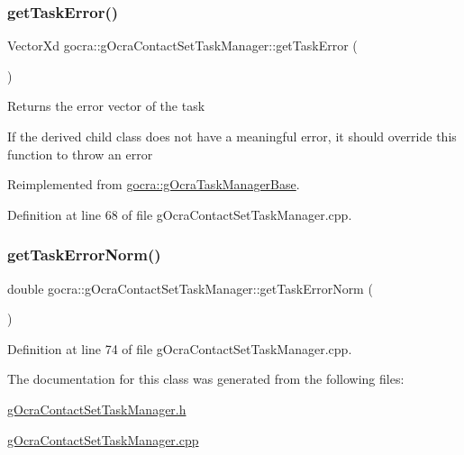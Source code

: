 \subsubsection{\texorpdfstring{get\+Task\+Error()}{getTaskError()}}
{\footnotesize\ttfamily Vector\+Xd gocra\+::g\+Ocra\+Contact\+Set\+Task\+Manager\+::get\+Task\+Error (\begin{DoxyParamCaption}{ }\end{DoxyParamCaption})\hspace{0.3cm}{\ttfamily [virtual]}}

Returns the error vector of the task

If the derived child class does not have a meaningful error, it should override this function to throw an error 

Reimplemented from \hyperlink{classgocra_1_1gOcraTaskManagerBase_a5c40a14b3a1d5a6519da422310d28f97}{gocra\+::g\+Ocra\+Task\+Manager\+Base}.



Definition at line 68 of file g\+Ocra\+Contact\+Set\+Task\+Manager.\+cpp.

\hypertarget{classgocra_1_1gOcraContactSetTaskManager_ac46c258f0b2762bce969b373baad110a}{}\label{classgocra_1_1gOcraContactSetTaskManager_ac46c258f0b2762bce969b373baad110a} 
\subsubsection{\texorpdfstring{get\+Task\+Error\+Norm()}{getTaskErrorNorm()}}
{\footnotesize\ttfamily double gocra\+::g\+Ocra\+Contact\+Set\+Task\+Manager\+::get\+Task\+Error\+Norm (\begin{DoxyParamCaption}{ }\end{DoxyParamCaption})}



Definition at line 74 of file g\+Ocra\+Contact\+Set\+Task\+Manager.\+cpp.



The documentation for this class was generated from the following files\+:\begin{DoxyCompactItemize}
\item 
\hyperlink{gOcraContactSetTaskManager_8h}{g\+Ocra\+Contact\+Set\+Task\+Manager.\+h}\item 
\hyperlink{gOcraContactSetTaskManager_8cpp}{g\+Ocra\+Contact\+Set\+Task\+Manager.\+cpp}\end{DoxyCompactItemize}
